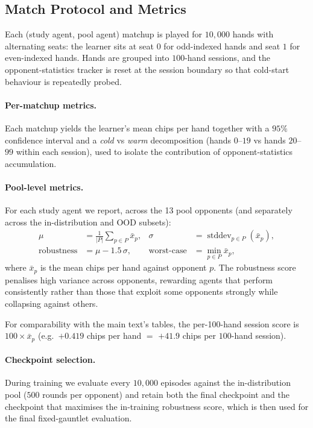 \subsection{Match Protocol and Metrics}

Each (study agent, pool agent) matchup is played for $10{,}000$ hands with
alternating seats: the learner sits at seat $0$ for odd-indexed hands and
seat $1$ for even-indexed hands. Hands are grouped into $100$-hand
sessions, and the opponent-statistics tracker is reset at the session
boundary so that cold-start behaviour is repeatedly probed.

\paragraph{Per-matchup metrics.}
Each matchup yields the learner's mean chips per hand together with a
$95\%$ confidence interval and a \emph{cold} vs \emph{warm} decomposition
(hands $0$--$19$ vs hands $20$--$99$ within each session), used to isolate
the contribution of opponent-statistics accumulation.

\paragraph{Pool-level metrics.}
For each study agent we report, across the 13 pool opponents (and
separately across the in-distribution and OOD subsets):
\begin{align*}
\mu       &= \tfrac{1}{|P|}\sum_{p\in P}\bar x_p, &
\sigma    &= \operatorname{stddev}_{p\in P}(\bar x_p), \\
\mathrm{robustness} &= \mu - 1.5\,\sigma, &
\mathrm{worst\text{-}case} &= \min_{p\in P}\bar x_p,
\end{align*}
where $\bar x_p$ is the mean chips per hand against opponent $p$. The
robustness score penalises high variance across opponents, rewarding
agents that perform consistently rather than those that exploit some
opponents strongly while collapsing against others.

For comparability with the main text's tables, the per-100-hand session
score is $100 \times \bar x_p$ (e.g.\ $+0.419$ chips per hand
$=$ $+41.9$ chips per $100$-hand session).

\paragraph{Checkpoint selection.}
During training we evaluate every $10{,}000$ episodes against the
in-distribution pool ($500$ rounds per opponent) and retain both the
final checkpoint and the checkpoint that maximises the in-training
robustness score, which is then used for the final fixed-gauntlet
evaluation.

